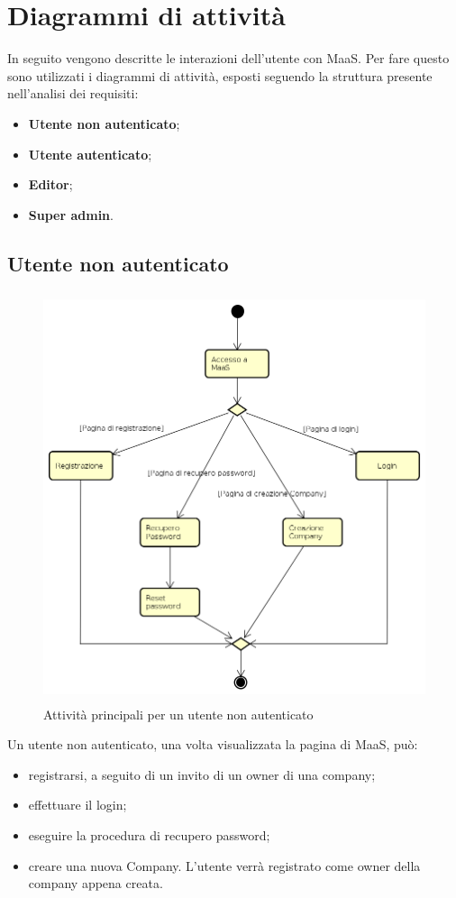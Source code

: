 \section{Diagrammi di attività}
In seguito vengono descritte le interazioni dell'utente con MaaS. Per fare questo sono utilizzati i diagrammi di attività, esposti seguendo la struttura presente nell'analisi dei requisiti:
\begin{itemize}
\item \textbf{Utente non autenticato};
\item \textbf{Utente autenticato};
\item \textbf{Editor};
\item \textbf{Super admin}.
\end{itemize}
\subsection{Utente non autenticato}
\begin{figure}[H]
\begin{center}
\includegraphics[height=12cm]{res/sections/backend/activities/principaliSenzaAuth.png}
\caption{Attività principali per un utente non autenticato}
\end{center}
\end{figure}
Un utente non autenticato, una volta visualizzata la pagina di MaaS, può:
\begin{itemize}
\item registrarsi, a seguito di un invito di un owner di una company;
\item effettuare il login;
\item eseguire la procedura di recupero password;
\item creare una nuova Company. L'utente verrà registrato come owner della company appena creata.
\end{itemize}
